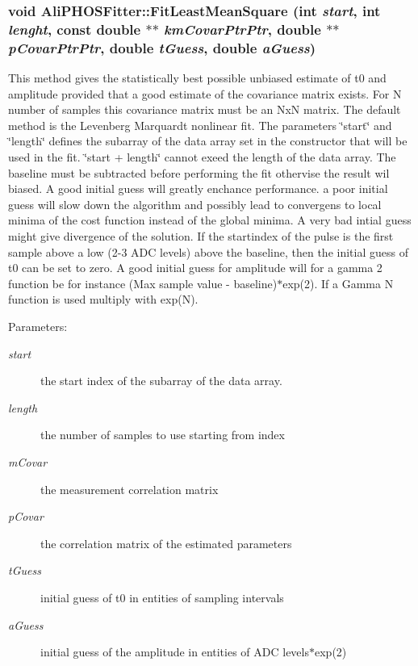 \subsubsection{\setlength{\rightskip}{0pt plus 5cm}void Ali\-PHOSFitter::Fit\-Least\-Mean\-Square (int {\em start}, int {\em lenght}, const double $\ast$$\ast$ {\em km\-Covar\-Ptr\-Ptr}, double $\ast$$\ast$ {\em p\-Covar\-Ptr\-Ptr}, double {\em t\-Guess}, double {\em a\-Guess})}\label{classAliPHOSFitter_a9}


This method gives the statistically best possible unbiased estimate of t0 and amplitude provided that a good estimate of the covariance matrix exists. For N number of samples this covariance matrix must be an Nx\-N matrix. The default method is the Levenberg Marquardt nonlinear fit. The parameters \char`\"{}start\char`\"{} and \char`\"{}length\char`\"{} defines the subarray of the data array set in the constructor that will be used in the fit. \char`\"{}start + length\char`\"{} cannot exeed the length of the data array. The baseline must be subtracted before performing the fit othervise the result wil biased. A good initial guess will greatly enchance performance. a poor initial guess will slow down the algorithm and possibly lead to convergens to local minima of the cost function instead of the global minima. A very bad intial guess might give divergence of the solution. If the startindex of the pulse is the first sample above a low (2-3 ADC levels) above the baseline, then the initial guess of t0 can be set to zero. A good initial guess for amplitude will for a gamma 2 function be for instance (Max sample value - baseline)$\ast$exp(2). If a Gamma N function is used multiply with exp(N). \begin{Desc}
\item[Parameters:]
\begin{description}
\item[{\em start}]the start index of the subarray of the data array. \item[{\em length}]the number of samples to use starting from index \item[{\em m\-Covar}]the measurement correlation matrix \item[{\em p\-Covar}]the correlation matrix of the estimated parameters \item[{\em t\-Guess}]initial guess of t0 in entities of sampling intervals \item[{\em a\-Guess}]initial guess of the amplitude in entities of ADC levels$\ast$exp(2) \end{description}
\end{Desc}
